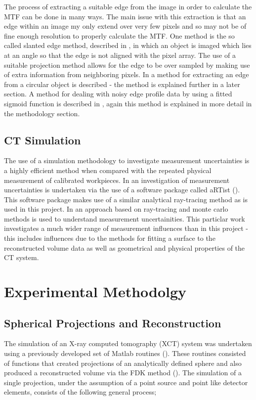 \documentclass[
  twoside,
  11pt, a4paper,
  footinclude=true,
  headinclude=true,
  cleardoublepage=empty
]{scrbook}
\begin{document}
The process of extracting a suitable edge from the image in order to calculate the MTF can be done in many ways. The main issue with this extraction is that an edge within an image my only extend over very few pixels and so may not be of fine enough resolution to properly calculate the MTF. One method is the so called slanted edge method, described in \cite{Kerr2010}, in which an object is imaged which lies at an angle so that the edge is not aligned with the pixel array. The use of a suitable projection method allows for the edge to be over sampled by making use of extra information from neighboring pixels. In \cite{Friedman2013} a method for extracting an edge from a circular object is described - the method is explained further in a later section. A method for dealing with noisy edge profile data by using a fitted sigmoid function is described in \cite{Takenaga2014}, again this method is explained in more detail in the methodology section.

\section{CT Simulation}

The use of a simulation methodology to investigate measurement uncertainties is a highly efficient method when compared with the repeated physical measurement of calibrated workpieces. In \cite{Bartscher2007} an investigation of measurement uncertainties is undertaken via the use of a software package called aRTist (\cite{Jaenisch2008}). This software package makes use of a similar analytical ray-tracing method as is used in this project. In \cite{Hiller2012} an approach based on ray-tracing and monte carlo methods is used to understand measurement uncertainities. This particlar work investigates a much wider range of measurement influences than in this project - this includes influences due to the methods for fitting a surface to the reconstructed volume data as well as geometrical and physical properties of the CT system.

\chapter{Experimental Methodolgy}

\section{Spherical Projections and Reconstruction}

The simulation of an X-ray computed tomography (XCT) system was undertaken using a previously developed set of Matlab routines (\cite{Athens2015}). These routines consisted of functions that created projections of an analytically defined sphere and also produced a reconstructed volume via the FDK method (\cite{Feldkamp1984}). The simulation of a single projection, under the assumption of a point source and point like detector elements, consists of the following general process;
\end{document}
